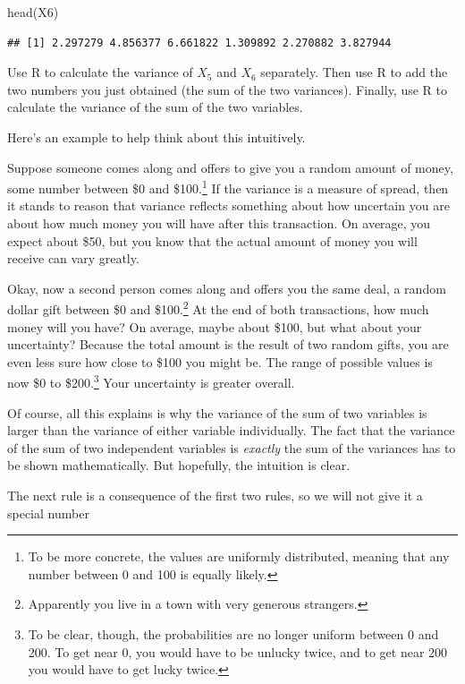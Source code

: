 \documentclass[
]{book}
\newenvironment{Shaded}{\begin{snugshade}}{\end{snugshade}}
\newcommand{\FunctionTok}[1]{\textcolor[rgb]{0.00,0.00,0.00}{#1}}
\newcommand{\NormalTok}[1]{#1}
\begin{document}
\begin{Shaded}
\begin{Highlighting}[]
\FunctionTok{head}\NormalTok{(X6)}
\end{Highlighting}
\end{Shaded}

\begin{verbatim}
## [1] 2.297279 4.856377 6.661822 1.309892 2.270882 3.827944
\end{verbatim}

Use R to calculate the variance of \(X_{5}\) and \(X_{6}\) separately. Then use R to add the two numbers you just obtained (the sum of the two variances). Finally, use R to calculate the variance of the sum of the two variables.

Here's an example to help think about this intuitively.

Suppose someone comes along and offers to give you a random amount of money, some number between \$0 and \$100.\footnote{To be more concrete, the values are uniformly distributed, meaning that any number between 0 and 100 is equally likely.} If the variance is a measure of spread, then it stands to reason that variance reflects something about how uncertain you are about how much money you will have after this transaction. On average, you expect about \$50, but you know that the actual amount of money you will receive can vary greatly.

Okay, now a second person comes along and offers you the same deal, a random dollar gift between \$0 and \$100.\footnote{Apparently you live in a town with very generous strangers.} At the end of both transactions, how much money will you have? On average, maybe about \$100, but what about your uncertainty? Because the total amount is the result of two random gifts, you are even less sure how close to \$100 you might be. The range of possible values is now \$0 to \$200.\footnote{To be clear, though, the probabilities are no longer uniform between 0 and 200. To get near 0, you would have to be unlucky twice, and to get near 200 you would have to get lucky twice.} Your uncertainty is greater overall.

Of course, all this explains is why the variance of the sum of two variables is larger than the variance of either variable individually. The fact that the variance of the sum of two independent variables is \emph{exactly} the sum of the variances has to be shown mathematically. But hopefully, the intuition is clear.

The next rule is a consequence of the first two rules, so we will not give it a special number
\end{document}
